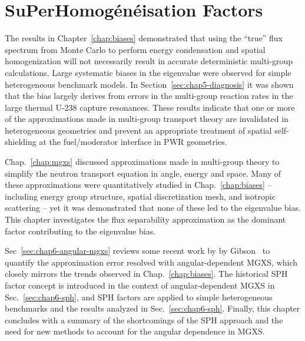\chapter{SuPerHomog\'{e}n\'{e}isation Factors}
\label{chap:sph}

The results in Chapter~\ref{chap:biases} demonstrated that using the ``true'' flux spectrum from Monte Carlo to perform energy condensation and spatial homogenization will not necessarily result in accurate deterministic multi-group calculations. Large systematic biases in the eigenvalue were observed for simple heterogeneous benchmark models. In Section~\ref{sec:chap5-diagnosis} it was shown that the bias largely derives from errors in the multi-group reaction rates in the large thermal U-238 capture resonances. These results indicate that one or more of the approximations made in multi-group transport theory are invalidated in heterogeneous geometries and prevent an appropriate treatment of spatial self-shielding at the fuel/moderator interface in \ac{PWR} geometries.



Chap.~\ref{chap:mgxs} discussed approximations made in multi-group theory to simplify the neutron transport equation in angle, energy and space. Many of these approximations were quantitatively studied in Chap.~\ref{chap:biases} -- including energy group structure, spatial discretization mesh, and isotropic scattering -- yet it was demonstrated that none of these led to the eigenvalue bias. This chapter investigates the flux separability approximation as the dominant factor contributing to the eigenvalue bias.

Sec~\ref{sec:chap6-angular-mgxs} reviews some recent work by by Gibson~\cite{gibson2016thesis} to quantify the approximation error resolved with angular-dependent \ac{MGXS}, which closely mirrors the trends observed in Chap.~\ref{chap:biases}. The historical \ac{SPH} factor concept is introduced in the context of angular-dependent \ac{MGXS} in Sec.~\ref{sec:chap6-sph}, and \ac{SPH} factors are applied to simple heterogeneous benchmarks and the results analyzed in Sec.~\ref{sec:chap6-sph}. Finally, this chapter concludes with a summary of the shortcomings of the \ac{SPH} approach and the need for new methods to account for the angular dependence in \ac{MGXS}.

